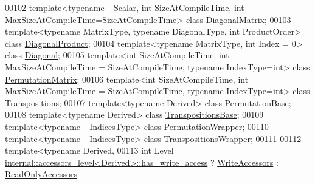 \begin{DoxyCode}
00102 \textcolor{keyword}{template}<\textcolor{keyword}{typename} \_Scalar, \textcolor{keywordtype}{int} SizeAtCompileTime, \textcolor{keywordtype}{int} MaxSizeAtCompileTime=SizeAtCompileTime> \textcolor{keyword}{class }
      \hyperlink{group___core___module_class_eigen_1_1_diagonal_matrix}{DiagonalMatrix};
\hyperlink{class_eigen_1_1_diagonal_product}{00103} \textcolor{keyword}{template}<\textcolor{keyword}{typename} MatrixType, \textcolor{keyword}{typename} DiagonalType, \textcolor{keywordtype}{int} ProductOrder> \textcolor{keyword}{class }
      \hyperlink{class_eigen_1_1_diagonal_product}{DiagonalProduct};
00104 \textcolor{keyword}{template}<\textcolor{keyword}{typename} MatrixType, \textcolor{keywordtype}{int} Index = 0> \textcolor{keyword}{class }\hyperlink{group___core___module_class_eigen_1_1_diagonal}{Diagonal};
00105 \textcolor{keyword}{template}<\textcolor{keywordtype}{int} SizeAtCompileTime, \textcolor{keywordtype}{int} MaxSizeAtCompileTime = SizeAtCompileTime, \textcolor{keyword}{typename} IndexType=\textcolor{keywordtype}{int}> \textcolor{keyword}{class
       }\hyperlink{group___core___module_class_eigen_1_1_permutation_matrix}{PermutationMatrix};
00106 \textcolor{keyword}{template}<\textcolor{keywordtype}{int} SizeAtCompileTime, \textcolor{keywordtype}{int} MaxSizeAtCompileTime = SizeAtCompileTime, \textcolor{keyword}{typename} IndexType=\textcolor{keywordtype}{int}> \textcolor{keyword}{class
       }\hyperlink{group___core___module_class_eigen_1_1_transpositions}{Transpositions};
00107 \textcolor{keyword}{template}<\textcolor{keyword}{typename} Derived> \textcolor{keyword}{class }\hyperlink{group___core___module_class_eigen_1_1_permutation_base}{PermutationBase};
00108 \textcolor{keyword}{template}<\textcolor{keyword}{typename} Derived> \textcolor{keyword}{class }\hyperlink{class_eigen_1_1_transpositions_base}{TranspositionsBase};
00109 \textcolor{keyword}{template}<\textcolor{keyword}{typename} \_IndicesType> \textcolor{keyword}{class }\hyperlink{group___core___module_class_eigen_1_1_permutation_wrapper}{PermutationWrapper};
00110 \textcolor{keyword}{template}<\textcolor{keyword}{typename} \_IndicesType> \textcolor{keyword}{class }\hyperlink{class_eigen_1_1_transpositions_wrapper}{TranspositionsWrapper};
00111 
00112 \textcolor{keyword}{template}<\textcolor{keyword}{typename} Derived,
00113          \textcolor{keywordtype}{int} Level = \hyperlink{struct_eigen_1_1internal_1_1accessors__level}{internal::accessors\_level<Derived>::has\_write\_access}
       ? \hyperlink{group__enums_gga9f93eac38eb83deb0e8dbd42ddf11d5da2c59ef3697d65866c3a8e16eda7881ab}{WriteAccessors} : \hyperlink{group__enums_gga9f93eac38eb83deb0e8dbd42ddf11d5da42865f87356ad7e585a1bfbfd1b81699}{ReadOnlyAccessors}

\end{DoxyCode}

